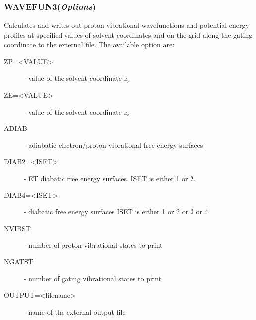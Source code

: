 \documentclass[oneside,11pt,openany]{book}
\newcommand{\tw}{\ttfamily}
\begin{document}
\subsubsection*{WAVEFUN3({\it Options})}
%
Calculates and writes out proton vibrational wavefunctions
and potential energy profiles at specified values of solvent
coordinates and on the grid along the gating coordinate
to the external file. The available option are:
%
\begin{description}
%
\item[{\tw ZP=<VALUE>}] - value of the solvent coordinate $z_p$
\item[{\tw ZE=<VALUE>}] - value of the solvent coordinate $z_e$

\item[{\tw ADIAB}] - adiabatic electron/proton vibrational free energy surfaces

\item[{\tw DIAB2=<ISET>}] - ET diabatic free energy surfaces.
                            {\tw ISET} is either 1 or 2.

\item[{\tw DIAB4=<ISET>}] - diabatic free energy surfaces
                            {\tw ISET} is either 1 or 2 or 3 or 4.

\item[{\tw NVIBST}] - number of proton vibrational states to print

\item[{\tw NGATST}] - number of gating vibrational states to print

\item[{\tw OUTPUT=<filename>}] - name of the external output file
%
\end{description}
\end{document}
